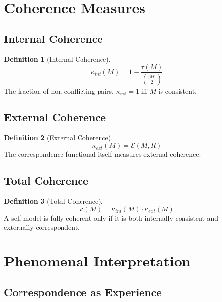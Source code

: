 \documentclass[12pt,a4paper]{article}
\theoremstyle{definition}
\newtheorem{definition}{Definition}[section]
\begin{document}
\section{Coherence Measures}

\subsection{Internal Coherence}

\begin{definition}[Internal Coherence]
\[ \kappa_{int}(M) = 1 - \frac{\tau(M)}{\binom{|M|}{2}} \]
The fraction of non-conflicting pairs. $\kappa_{int} = 1$ iff $M$ is consistent.
\end{definition}

\subsection{External Coherence}

\begin{definition}[External Coherence]
\[ \kappa_{ext}(M) = \mathcal{E}(M, R) \]
The correspondence functional itself measures external coherence.
\end{definition}

\subsection{Total Coherence}

\begin{definition}[Total Coherence]
\[ \kappa(M) = \kappa_{int}(M) \cdot \kappa_{ext}(M) \]
A self-model is fully coherent only if it is both internally consistent and externally correspondent.
\end{definition}

\section{Phenomenal Interpretation}

\subsection{Correspondence as Experience}
\end{document}
